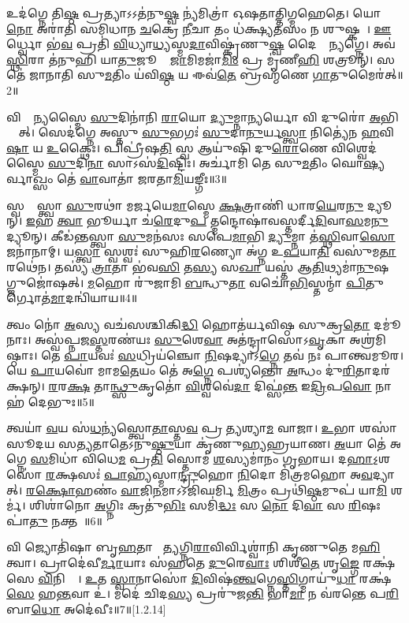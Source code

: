 𑌉𑌦॑𑌗𑍍𑌨𑍇 𑌤𑌿\ul{𑌷𑍍𑌠} 𑌪𑍍𑌰𑌤𑍍𑌯𑌾𑌽𑌽𑌤॑𑌨𑍁\ul{𑌷𑍍𑌵} 𑌨𑍍𑌯॑𑌮𑌿𑌤𑍍𑌰𑌾॑ 𑌓𑌷𑌤𑌾𑌤𑍍𑌤𑌿𑌗𑍍𑌮𑌹𑍇𑌤𑍇। 𑌯𑍋 \ul{𑌨𑍋} 𑌅𑌰𑌾॑𑌤𑌿 𑌸𑌮𑌿𑌧𑌾𑌨 \ul{𑌚}𑌕𑍍𑌰𑍇 \ul{𑌨𑍀}𑌚𑌾 𑌤𑌂 𑌧॑𑌕𑍍𑌷𑍍𑌯\ul{𑌤}𑌸𑌂 𑌨 𑌶𑍁𑌷𑍍𑌕𑌮𑍍᳚। \ul{𑌊}𑌰𑍍𑌧𑍍𑌵𑍋 𑌭॑\ul{𑌵} 𑌪𑍍𑌰𑌤𑌿॑ \ul{𑌵𑌿}𑌧𑍍𑌯𑌾\ul{𑌧𑍍𑌯}𑌸𑍍𑌮\ul{𑌦𑌾}𑌵𑌿𑌷𑍍𑌕𑍃॑𑌣𑍁\ul{𑌷𑍍𑌵} 𑌦𑍈𑌵𑍍𑌯𑌾᳚𑌨𑍍𑌯𑌗𑍍𑌨𑍇। 𑌅𑌵॑ \ul{𑌸𑍍𑌥𑌿}𑌰𑌾 𑌤॑𑌨𑍁𑌹𑌿 𑌯𑌾\ul{𑌤𑍁}𑌜𑍂𑌨𑌾𑌂᳚ \ul{𑌜𑌾}𑌮𑌿𑌮𑌜𑌾॑\ul{𑌮𑌿𑌂} 𑌪𑍍𑌰 𑌮𑍃॑𑌣𑍀\ul{𑌹𑌿} 𑌶𑌤𑍍𑌰𑍂𑌨𑍍॑। 𑌸 𑌤𑍇॑ 𑌜𑌾𑌨𑌾𑌤𑌿 𑌸𑍁\ul{𑌮}𑌤𑌿𑌂 𑌯॑𑌵𑌿\ul{𑌷𑍍𑌠} 𑌯 𑌈𑌵॑\ul{𑌤𑍇} 𑌬𑍍𑌰𑌹𑍍𑌮॑𑌣𑍇 \ul{𑌗𑌾}𑌤𑍁𑌮𑍈𑌰॑𑌤𑍍॥2॥

 𑌵𑌿𑌶𑍍𑌵𑌾᳚𑌨𑍍𑌯𑌸𑍍𑌮𑍈 \ul{𑌸𑍁}𑌦𑌿𑌨𑌾॑𑌨𑌿 \ul{𑌰𑌾}𑌯𑍋 \ul{𑌦𑍍𑌯𑍁}𑌮𑍍𑌨𑌾\ul{𑌨𑍍𑌯}𑌰𑍍𑌯𑍋 𑌵𑌿 𑌦𑍁𑌰𑍋॑ \ul{𑌅}𑌭𑌿 𑌦𑍍𑌯𑍗᳚𑌤𑍍। 𑌸𑍇𑌦॑𑌗𑍍𑌨𑍇 𑌅𑌸𑍍𑌤𑍁 \ul{𑌸𑍁}𑌭𑌗𑌃॑ \ul{𑌸𑍁}𑌦𑌾\ul{𑌨𑍁}𑌰𑍍𑌯\ul{𑌸𑍍𑌤𑍍𑌵𑌾} 𑌨𑌿𑌤𑍍𑌯𑍇॑𑌨 \ul{𑌹}𑌵𑌿\ul{𑌷𑌾} 𑌯 \ul{𑌉}𑌕𑍍𑌥𑍈𑌃। 𑌪𑌿𑌪𑍍𑌰𑍀॑𑌷\ul{𑌤𑌿} 𑌸𑍍𑌵 𑌆𑌯𑍁॑𑌷𑌿 𑌦𑍁\ul{𑌰𑍋}𑌣𑍇 𑌵𑌿𑌶𑍍𑌵𑍇𑌦॑𑌸𑍍𑌮𑍈 \ul{𑌸𑍁}𑌦𑌿\ul{𑌨𑌾} 𑌸𑌾𑌽𑌸॑\ul{𑌦𑌿}𑌷𑍍𑌟𑌿𑌃। 𑌅𑌰𑍍𑌚𑌾॑𑌮𑌿 𑌤𑍇 𑌸𑍁\ul{𑌮}𑌤𑌿𑌂 𑌘𑍋\ul{𑌷𑍍𑌯}𑌰𑍍𑌵𑌾𑌖𑍍𑌸𑌂 𑌤𑍇॑ \ul{𑌵𑌾}𑌵𑌾𑌤𑌾॑ 𑌜𑌰𑌤𑌾\ul{𑌮𑌿}𑌯𑌙𑍍𑌗𑍀𑌃॥3॥
 
𑌸𑍍𑌵𑌶𑍍𑌵𑌾᳚𑌸𑍍𑌤𑍍𑌵𑌾 \ul{𑌸𑍁}𑌰𑌥𑌾॑ 𑌮𑌰𑍍𑌜𑌯𑍇\ul{𑌮𑌾}𑌸𑍍𑌮𑍇 \ul{𑌕𑍍𑌷}𑌤𑍍𑌰𑌾𑌣𑌿॑ 𑌧𑌾𑌰\ul{𑌯𑍇}𑌰\ul{𑌨𑍁} 𑌦𑍍𑌯𑍂𑌨𑍍। \ul{𑌇}𑌹 \ul{𑌤𑍍𑌵𑌾} 𑌭𑍂𑌰𑍍𑌯𑌾 𑌚॑\ul{𑌰𑍇}𑌦𑍁\ul{𑌪} 𑌤𑍍𑌮𑌨𑍍𑌦𑍋𑌷𑌾॑\-𑌵𑌸𑍍𑌤𑌰𑍍𑌦𑍀\ul{𑌦𑌿}𑌵𑌾\-\ul{𑌸}𑌮\ul{𑌨𑍁} 𑌦𑍍𑌯𑍂𑌨𑍍। 𑌕𑍀𑌡॑𑌨𑍍𑌤𑌸𑍍𑌤𑍍𑌵𑌾 \ul{𑌸𑍁}𑌮𑌨॑𑌸𑌃 𑌸𑌪𑍇\ul{𑌮𑌾}𑌭𑌿 \ul{𑌦𑍍𑌯𑍁}𑌮𑍍𑌨𑌾 𑌤॑\ul{𑌸𑍍𑌥𑌿}𑌵𑌾\ul{𑌸𑍋} 𑌜𑌨𑌾॑𑌨𑌾𑌮𑍍। 𑌯\ul{𑌸𑍍𑌤𑍍𑌵𑌾} 𑌸𑍍𑌵𑌶𑍍𑌵𑌃॑ 𑌸𑍁𑌹𑌿\ul{𑌰}𑌣𑍍𑌯𑍋 𑌅॑𑌗𑍍𑌨 𑌉\ul{𑌪}𑌯𑌾\ul{𑌤𑌿} 𑌵𑌸𑍁॑𑌮\ul{𑌤𑌾} 𑌰𑌥𑍇॑𑌨। 𑌤𑌸𑍍𑌯॑ \ul{𑌤𑍍𑌰𑌾}𑌤𑌾 𑌭॑𑌵\ul{𑌸𑌿} 𑌤\ul{𑌸𑍍𑌯} 𑌸\ul{𑌖𑌾} 𑌯𑌸𑍍𑌤॑ 𑌆\ul{𑌤𑌿}𑌥𑍍𑌯𑌮𑌾॑\ul{𑌨𑍁}𑌷𑌗𑍍𑌜𑍁𑌜𑍋॑𑌷𑌤𑍍। \ul{𑌮}𑌹𑍋 𑌰𑍁॑𑌜𑌾𑌮𑌿 \ul{𑌬}𑌨𑍍𑌧𑍁\ul{𑌤𑌾} 𑌵𑌚𑍋॑\ul{𑌭𑌿}𑌸𑍍𑌤𑌨𑍍𑌮𑌾॑ \ul{𑌪𑌿}𑌤𑍁𑌰𑍍𑌗𑍋𑌤॑\ul{𑌮𑌾}𑌦𑌨𑍍𑌵𑌿॑𑌯𑌾𑌯॥4॥

 𑌤𑍍𑌵𑌂 𑌨𑍋॑ \ul{𑌅}𑌸𑍍𑌯 𑌵𑌚॑𑌸𑌶𑍍𑌚𑌿𑌕𑌿\ul{𑌦𑍍𑌧𑌿} 𑌹𑍋𑌤॑𑌰𑍍𑌯𑌵𑌿𑌷𑍍𑌠 𑌸𑍁𑌕𑍍𑌰\ul{𑌤𑍋} 𑌦𑌮𑍂॑𑌨𑌾𑌃। 𑌅𑌸𑍍𑌵॑𑌪𑍍𑌨𑌜\ul{𑌸𑍍𑌤}𑌰𑌣॑𑌯𑌃 \ul{𑌸𑍁}𑌶𑍇\ul{𑌵𑌾} 𑌅𑌤॑𑌨𑍍𑌦𑍍𑌰𑌾𑌸𑍋𑌽\ul{𑌵𑍃}𑌕𑌾 𑌅𑌶𑍍𑌰॑𑌮𑌿𑌷𑍍𑌠𑌾𑌃। 𑌤𑍇 \ul{𑌪𑌾}𑌯𑌵𑌃॑ \ul{𑌸}𑌧𑍍𑌰𑌿𑌯॑𑌞𑍍𑌚𑍋 \ul{𑌨𑌿}𑌷𑌦𑍍𑌯𑌾𑌽\ul{𑌗𑍍𑌨𑍇} 𑌤𑌵॑ 𑌨𑌃 𑌪𑌾𑌨𑍍𑌤𑍍𑌵𑌮𑍂𑌰। 𑌯𑍇 \ul{𑌪𑌾}𑌯𑌵𑍋॑ 𑌮𑌾𑌮\ul{𑌤𑍇}𑌯𑌂 𑌤𑍇॑ 𑌅\ul{𑌗𑍍𑌨𑍇} 𑌪𑌶𑍍𑌯॑𑌨𑍍𑌤𑍋 \ul{𑌅}𑌨𑍍𑌧𑌂 𑌦𑍁॑\ul{𑌰𑌿}𑌤𑌾𑌦𑌰॑𑌕𑍍𑌷𑌨𑍍। \ul{𑌰}𑌰\ul{𑌕𑍍𑌷} 𑌤𑌾\ul{𑌨𑍍𑌥𑍍𑌸𑍁}𑌕𑍃𑌤𑍋॑ \ul{𑌵𑌿}𑌶𑍍𑌵𑌵𑍇॑\ul{𑌦𑌾} 𑌦𑌿𑌫𑍍𑌸॑\ul{𑌨𑍍𑌤} 𑌇\ul{𑌦𑍍𑌰𑌿}𑌪\ul{𑌵𑍋} 𑌨𑌾 𑌹॑ 𑌦𑍇𑌭𑍁𑌃॥5॥
 
𑌤𑍍𑌵𑌯𑌾॑ \ul{𑌵}𑌯 𑌸॑\ul{𑌧}𑌨𑍍𑌯॑𑌸𑍍𑌤𑍍𑌵𑍋\ul{𑌤𑌾}𑌸𑍍𑌤\ul{𑌵} 𑌪𑍍𑌰𑌣𑍀᳚𑌤𑍍𑌯𑌶𑍍𑌯𑌾\ul{𑌮} 𑌵𑌾𑌜𑌾\sn{}। \ul{𑌉}𑌭𑌾 𑌶𑌸𑌾॑ 𑌸𑍂𑌦𑌯 𑌸𑌤𑍍𑌯𑌤𑌾𑌤𑍇𑌽𑌨𑍁\ul{𑌷𑍍𑌠𑍁}𑌯𑌾 𑌕𑍃॑𑌣𑍁𑌹𑍍𑌯𑌹𑍍𑌰𑌯𑌾𑌣। \ul{𑌅}𑌯𑌾 𑌤𑍇॑ 𑌅𑌗𑍍𑌨𑍇 \ul{𑌸}𑌮𑌿𑌧𑌾॑ 𑌵𑌿𑌧𑍇\ul{𑌮} 𑌪𑍍𑌰\ul{𑌤𑌿} 𑌸𑍍𑌤𑍋𑌮॑ \ul{𑌶}𑌸𑍍𑌯𑌮𑌾॑𑌨𑌂 𑌗𑍃𑌭𑌾𑌯। 𑌦\ul{𑌹𑌾}𑌽॒𑌶𑌸𑍋॑ \ul{𑌰}𑌕𑍍𑌷𑌸𑌃॑ \ul{𑌪𑌾}𑌹𑍍𑌯॑𑌸𑍍𑌮𑌾\ul{𑌨𑍍𑌦𑍍𑌰𑍁}𑌹𑍋 \ul{𑌨𑌿}𑌦𑍋 𑌮𑌿॑𑌤𑍍𑌰𑌮𑌹𑍋 𑌅\ul{𑌵}𑌦𑍍𑌯𑌾𑌤𑍍। \ul{𑌰}\ul{𑌕𑍍𑌷𑍋}𑌹𑌣𑌂॑ \ul{𑌵𑌾}𑌜𑌿\ul{𑌨}𑌮𑌾𑌽𑌽𑌜𑌿॑𑌘𑌰𑍍𑌮𑌿 \ul{𑌮𑌿}𑌤𑍍𑌰𑌂 𑌪𑍍𑌰𑌥𑌿॑\ul{𑌷𑍍𑌠}𑌮𑍁𑌪॑ 𑌯𑌾\ul{𑌮𑌿} 𑌶𑌰𑍍𑌮॑। 𑌶𑌿𑌶𑌾॑𑌨𑍋 \ul{𑌅}𑌗𑍍𑌨𑌿𑌃 𑌕𑍍𑌰𑌤𑍁॑\ul{𑌭𑌿𑌃} 𑌸𑌮𑌿॑\ul{𑌦𑍍𑌧𑌃} 𑌸 \ul{𑌨𑍋} 𑌦𑌿\ul{𑌵𑌾} 𑌸 \ul{𑌰𑌿}𑌷𑌃 𑌪𑌾॑\ul{𑌤𑍁} 𑌨𑌕𑍍𑌤𑌮𑍍᳚॥6॥

 𑌵𑌿 𑌜𑍍𑌯𑍋𑌤𑌿॑𑌷𑌾 𑌬𑍃\ul{𑌹}𑌤𑌾 𑌭𑌾᳚\ul{𑌤𑍍𑌯}𑌗𑍍𑌨𑌿\ul{𑌰𑌾}𑌵𑌿𑌰𑍍𑌵𑌿𑌶𑍍𑌵𑌾॑𑌨𑌿 𑌕𑍃𑌣𑍁𑌤𑍇 𑌮\ul{𑌹𑌿}𑌤𑍍𑌵𑌾। 𑌪𑍍𑌰𑌾𑌦𑍇॑𑌵𑍀\ul{𑌰𑍍𑌮𑌾}𑌯𑌾𑌃 𑌸॑𑌹𑌤𑍇 \ul{𑌦𑍁}𑌰𑍇\ul{𑌵𑌾𑌃} 𑌶𑌿𑌶𑍀॑\ul{𑌤𑍇} 𑌶𑍃\ul{𑌙𑍍𑌗𑍇} 𑌰𑌕𑍍𑌷॑𑌸𑍇 \ul{𑌵𑌿}𑌨𑌿𑌕𑍍𑌷𑍇᳚। \ul{𑌉}𑌤 \ul{𑌸𑍍𑌵𑌾}𑌨𑌾𑌸𑍋॑ \ul{𑌦𑌿}𑌵𑌿𑌷॑\ul{𑌨𑍍𑌤𑍍𑌵}𑌗𑍍𑌨𑍇\ul{𑌸𑍍𑌤𑌿}𑌗𑍍𑌮𑌾𑌯𑍁॑\ul{𑌧𑌾} 𑌰𑌕𑍍𑌷॑\ul{𑌸𑍇} 𑌹\ul{𑌨𑍍𑌤}𑌵𑌾 𑌉॑। 𑌮𑌦𑍇॑ 𑌚𑌿𑌦\ul{𑌸𑍍𑌯} 𑌪𑍍𑌰𑌰𑍁॑𑌜\ul{𑌨𑍍𑌤𑌿} 𑌭𑌾\ul{𑌮𑌾} 𑌨 𑌵॑𑌰𑌨𑍍𑌤𑍇 𑌪\ul{𑌰𑌿}𑌬𑌾\ul{𑌧𑍋} 𑌅𑌦𑍇॑𑌵𑍀𑌃॥7॥[1.2.14]

